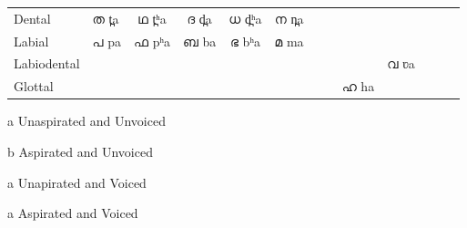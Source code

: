 \documentclass{ieeeaccess}
\begin{document}
\begin{table}
\begin{center}
\begin{threeparttable}
\begin{tabular*}{\textwidth}{@{\extracolsep{\fill}}llccccccccccc@{\extracolsep{\fill}}}
				Dental                       & {\mal ത} {\ipa t̪a}                                         & {\mal ഥ} {\ipa t̪ʰa} & {\mal ദ} {\ipa d̪a}  & {\mal ധ} {\ipa d̪ʰa} & {\mal ന} {\ipa n̪a} &              &             &             &                           \\

				Labial                       & {\mal പ} {\ipa pa}                                         & {\mal ഫ} {\ipa pʰa} & {\mal ബ} {\ipa ba}  & {\mal ഭ} {\ipa bʰa} & {\mal മ} {\ipa ma} &              &             &             &                           \\

				Labiodental                  &                                                     &              &              &              &             &              &             &             & {\mal വ} {\ipa ʋa}               \\
				Glottal                      &                                                     &              &              &              &             &              &             & {\mal ഹ} {\ipa ha} &                           \\
				\hline
			\end{tabular*}
       \begin{tablenotes}
       \item [a] Unaspirated and Unvoiced        \item [b] Aspirated and Unvoiced \item [a] Unapirated and Voiced \item [a] Aspirated and Voiced
       \end{tablenotes}

  \end{threeparttable}	
  \end{center}
\end{table}
\end{document}
